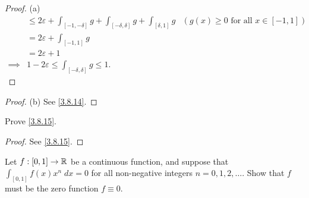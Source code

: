 \begin{proof}{(a)}
\begin{align*}
             & \leq 2 \varepsilon + \int_{[-1, -\delta]} g + \int_{[-\delta, \delta]} g + \int_{[\delta, 1]} g & (g(x) \geq 0 \text{ for all } x \in [-1, 1]) \\
             & = 2 \varepsilon + \int_{[-1, 1]} g                                                                                                             \\
             & = 2 \varepsilon + 1                                                                                                                            \\
    \implies & 1 - 2 \varepsilon \leq \int_{[-\delta, \delta]} g \leq 1.
  \end{align*}
\end{proof}

\begin{proof}{(b)}
  See \cref{3.8.14}.
\end{proof}

\begin{ex}\label{ex:3.8.7}
  Prove \cref{3.8.15}.
\end{ex}

\begin{proof}
  See \cref{3.8.15}.
\end{proof}

\begin{ex}\label{ex:3.8.8}
  Let \(f : [0, 1] \to \mathbb{R}\) be a continuous function, and suppose that \(\int_{[0, 1]} f(x) x^n \; dx = 0\) for all non-negative integers \(n = 0, 1, 2, \dots\).
  Show that \(f\) must be the zero function \(f \equiv 0\).
\end{ex}

